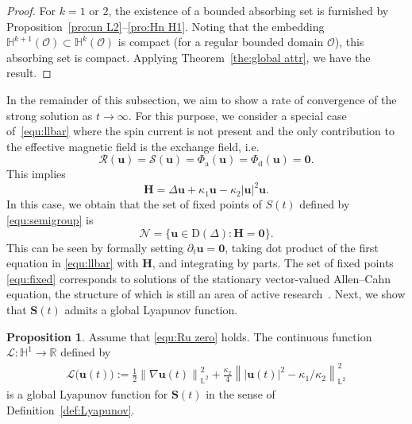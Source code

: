 \documentclass[11pt, reqno]{amsart}
\theoremstyle{definition}
\newtheorem{proposition}[theorem]{Proposition}
\numberwithin{equation}{section}
\newcommand{\bff}{\boldsymbol}
\newcommand{\bb}{\mathbb}
\newcommand{\norm}[2]{\left\|{#1}\right\|_{#2}}
\begin{document}
\begin{proof}
For $k=1$ or $2$, the existence of a bounded absorbing set is furnished by Proposition~\ref{pro:un L2}--\ref{pro:Hn H1}. Noting that the embedding $\bb{H}^{k+1}(\mathscr{O}) \subset \bb{H}^k(\mathscr{O})$ is compact (for a regular bounded domain $\mathscr{O}$), this absorbing set is compact. Applying Theorem~\ref{the:global attr}, we have the result.
\end{proof}


In the remainder of this subsection, we aim to show a rate of convergence of the strong solution as $t\to\infty$.
For this purpose, we consider a special case of~\eqref{equ:llbar} where the spin current is not present and the only contribution to the effective magnetic field is the exchange field, i.e.
\begin{equation}\label{equ:Ru zero}
\mathcal{R}(\bff{u}) =\mathcal{S}(\bff{u})= \Phi_{\mathrm{a}}(\bff{u})=\Phi_{\mathrm{d}}(\bff{u}) = \bff{0}. 
\end{equation}
This implies
\begin{equation}\label{equ:H zero}
    \bff{H}=\Delta \bff{u}+\kappa_1 \bff{u}-\kappa_2 |\bff{u}|^2 \bff{u}.
\end{equation}
In this case, we obtain that the set of fixed points of $S(t)$ defined by \eqref{equ:semigroup} is
\begin{equation}\label{equ:fixed}
	\mathcal{N} = \big\{ \bff{u}\in \text{D}(\Delta) : \bff{H}=\bff{0} \big\}.
\end{equation}
This can be seen by formally setting $\partial_t \bff{u}= \bff{0}$, taking dot product of the first equation in \eqref{equ:llbar} with $\bff{H}$, and integrating by parts. The set of fixed points \eqref{equ:fixed} corresponds to solutions of the stationary vector-valued Allen--Cahn equation, the structure of which is still an area of active research~\cite{AliFusSmy18, Sou15}. Next, we show that $\bff{S}(t)$ admits a global Lyapunov function.

\begin{proposition}
Assume that \eqref{equ:Ru zero} holds. The continuous function $\mathcal{L}:\bb{H}^1\to \bb{R}$ defined by
\begin{align*}
	\mathcal{L}\big(\bff{u}(t)\big) := \frac{1}{2} \norm{\nabla \bff{u}(t)}{\bb{L}^2}^2
	+
	\frac{\kappa_2}{4} \norm{|\bff{u}(t)|^2 - \kappa_1/\kappa_2}{\bb{L}^2}^2
\end{align*}
is a global Lyapunov function for $\bff{S}(t)$ in the sense of Definition~\ref{def:Lyapunov}.
\end{proposition}
\end{document}
